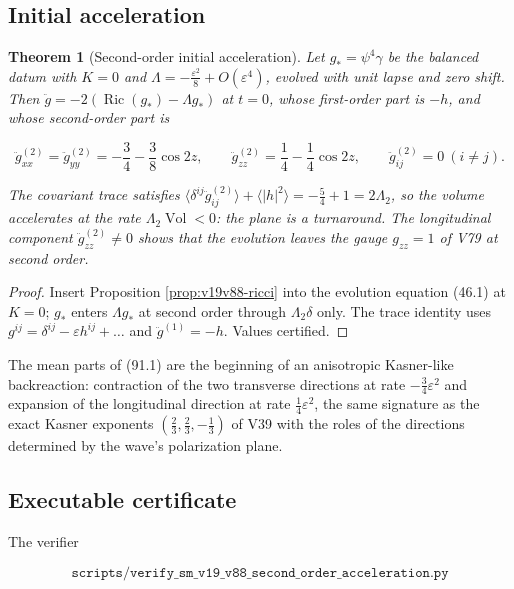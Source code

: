 \documentclass[11pt]{article}
\newtheorem{theorem}{Theorem}[section]
\theoremstyle{remark}
\begin{document}
\subsection{Initial acceleration}

\begin{theorem}[Second-order initial acceleration]
\label{thm:v19v88-acceleration}
Let \(g_*=\psi^4\gamma\) be the balanced datum with \(K=0\) and
\(\Lambda=-\tfrac{\varepsilon^2}8+O(\varepsilon^4)\), evolved with unit
lapse and zero shift.  Then \(\ddot g=-2(\operatorname{Ric}(g_*)-\Lambda g_*)\)
at \(t=0\), whose first-order part is \(-h\), and whose second-order
part is

\[
 \ddot g^{(2)}_{xx}=\ddot g^{(2)}_{yy}=-\frac34-\frac38\cos2z,
 \qquad
 \ddot g^{(2)}_{zz}=\frac14-\frac14\cos2z,
 \qquad
 \ddot g^{(2)}_{ij}=0\ (i\neq j).                                        \tag{91.1}
\]

The covariant trace satisfies
\(\langle\delta^{ij}\ddot g^{(2)}_{ij}\rangle+\langle|h|^2\rangle=-\tfrac54+1=2\Lambda_2\),
so the volume accelerates at the rate \(\Lambda_2\operatorname{Vol}<0\):
the plane is a turnaround.  The longitudinal component
\(\ddot g_{zz}^{(2)}\neq0\) shows that the evolution leaves the gauge
\(g_{zz}=1\) of V79 at second order.
\end{theorem}

\begin{proof}
Insert Proposition \ref{prop:v19v88-ricci} into the evolution
equation (46.1) at \(K=0\); \(g_*\) enters \(\Lambda g_*\) at second
order through \(\Lambda_2\delta\) only.  The trace identity uses
\(g^{ij}=\delta^{ij}-\varepsilon h^{ij}+\dots\) and
\(\ddot g^{(1)}=-h\).  Values certified.
\end{proof}

The mean parts of (91.1) are the beginning of an anisotropic
Kasner-like backreaction: contraction of the two transverse directions
at rate \(-\tfrac34\varepsilon^2\) and expansion of the longitudinal
direction at rate \(\tfrac14\varepsilon^2\), the same signature as the
exact Kasner exponents \((\tfrac23,\tfrac23,-\tfrac13)\) of V39 with
the roles of the directions determined by the wave's polarization
plane.

\subsection{Executable certificate}

The verifier

\[
 \texttt{scripts/verify\_sm\_v19\_v88\_second\_order\_acceleration.py}
                                                                    \tag{91.2}
\]
\end{document}
